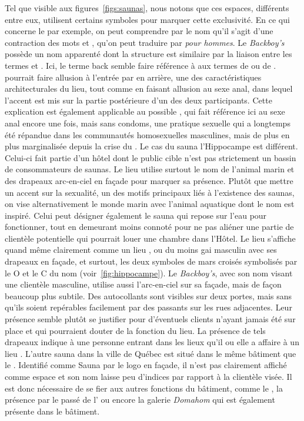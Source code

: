Tel que visible aux figures~\ref{figs:saunas}, nous notons que ces espaces, différents entre eux, utilisent certains symboles pour marquer cette exclusivité.
En ce qui concerne le  par exemple, on peut comprendre par le nom qu'il s'agit d'une contraction des mots  et , qu'on peut traduire par \emph{pour hommes}.
Le \emph{Backboy's} possède un nom apparenté dont la structure est similaire par la liaison entre les termes  et .
Ici, le terme back semble faire référence à aux termes de  ou de .
 pourrait faire allusion à l'entrée par en arrière, une des caractéristiques architecturales du lieu, tout comme en faisant allusion au sexe anal, dans lequel l'accent est mis sur la partie postérieure d'un des deux participants.
Cette explication est également applicable au possible , qui fait référence ici au sexe anal encore une fois, mais sans condoms, une pratique sexuelle qui a longtemps été répandue dans les communautés homosexuelles masculines, mais de plus en plus marginalisée depuis la crise du \sida{}.
Le cas du sauna l'Hippocampe est différent.
Celui-ci fait partie d'un hôtel dont le public cible n'est pas strictement un bassin de consommateurs de saunas.
Le lieu utilise surtout le nom de l'animal marin et des drapeaux arc-en-ciel en façade pour marquer sa présence.
Plutôt que mettre un accent sur la sexualité, un des motifs principaux liés à l'existence des saunas, on vise alternativement le monde marin avec l'animal aquatique dont le nom est inspiré.
Celui peut désigner également le sauna qui repose sur l'eau pour fonctionner, tout en demeurant moins connoté pour ne pas aliéner une partie de clientèle potentielle qui pourrait louer une chambre dans l'Hôtel.
Le lieu s'affiche quand même clairement comme un lieu \lgbt{}, ou du moins gai masculin avec ses drapeaux en façade, et surtout, les deux symboles de mars croisés symbolisés par le O et le C du nom (voir~\ref{fig:hippocampe}).
Le \emph{Backboy's}, avec son nom visant une clientèle masculine, utilise aussi l'arc-en-ciel sur sa façade, mais de façon beaucoup plus subtile.
Des autocollants sont visibles sur deux portes, mais sans qu'ils soient repérables facilement par des passants sur les rues adjacentes.
Leur présence semble plutôt se justifier pour d'éventuels clients n'ayant jamais été sur place et qui pourraient douter de la fonction du lieu.
La présence de tels drapeaux indique à une personne entrant dans les lieux qu'il ou elle a affaire à un lieu \lgbt{}.
L'autre sauna dans la ville de Québec est situé dans le même bâtiment que le .
Identifié comme Sauna par le logo en façade, il n'est pas clairement affiché comme espace \lgbt{} et son nom laisse peu d'indices par rapport à la clientèle visée.
Il est donc nécessaire de se fier aux autres fonctions du bâtiment, comme le , la présence par le passé de l'\ascgcn{} ou encore la galerie \emph{Domahom} qui est également présente dans le bâtiment.

